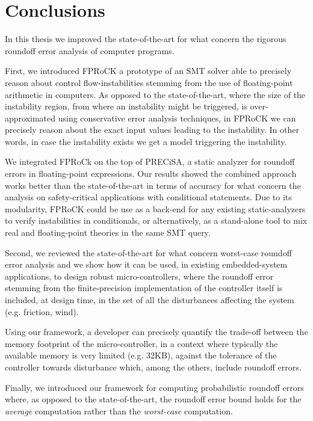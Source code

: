 
\chapter{Conclusions}
\label{sec:conclusion}
In this thesis we improved the state-of-the-art for what concern the rigorous roundoff error analysis of computer programs.
%

First, we introduced FPRoCK a prototype of an SMT solver able to precisely reason about control flow-instabilities stemming from the use of floating-point arithmetic in computers.
%
As opposed to the state-of-the-art, where the size of the instability region, from where an instability might be triggered, is over-approximated using conservative error analysis techniques, in FPRoCK we can precisely reason about the exact input values leading to the instability. 
%
In other words, in case the instability exists we get a model triggering the instability.
%

We integrated FPRoCk on the top of PRECiSA, a static analyzer for roundoff errors in floating-point expressions.
%
Our results showed the combined approach works better than the state-of-the-art in terms of accuracy for what concern the analysis on safety-critical applications with conditional statements.
%
Due to its modularity, FPRoCK could be use as a back-end for any existing static-analyzers to verify instabilities in conditionals, or alternatively, as a stand-alone tool to mix real and floating-point theories in the same SMT query.
%

Second, we reviewed the state-of-the-art for what concern worst-case roundoff error analysis and we show how it can be used, in existing embedded-system applications, to design robust micro-controllers, where the roundoff error stemming from the finite-precision implementation of the controller itself is included, at design time, in the set of all the disturbances affecting the system (e.g. friction, wind).
%

Using our framework, a developer can precisely quantify the trade-off between the memory footprint of the micro-controller, in a context where typically the available memory is very limited (e.g. 32KB), against the tolerance of the controller towards disturbance which, among the others, include roundoff errors. 
%

Finally, we introduced our framework for computing probabilistic roundoff errors where, as opposed to the state-of-the-art, the roundoff error bound holds for the \emph{average} computation rather than the \emph{worst-case} computation.
%

